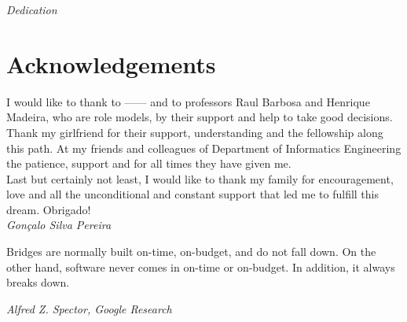 
\pagestyle{empty}
\begin{center}

\emph{Dedication}

\end{center}



\newpage
\pagestyle{fancy}
\section*{Acknowledgements}

I would like to thank to ------ and to professors Raul Barbosa and Henrique Madeira, who are role models, by their support and help to take good decisions.\\

Thank my girlfriend for their support, understanding and the fellowship along this path. At my friends and colleagues of Department of Informatics Engineering the patience, support and for all times they have given me. \\

Last but certainly not least, I would like to thank my family for encouragement, love and all the unconditional and constant support that led me to fulfill this dream. Obrigado!\\



\emph{\hfill Gonçalo Silva Pereira}

\newpage

\vspace*{\fill}
\pagestyle{empty}

\begin{shadequote}
Bridges are normally built on-time, on-budget, and do not
fall down. On the other hand, software never comes in on-time
or on-budget. In addition, it always breaks down.\par\emph{Alfred Z. Spector, Google Research}
\end{shadequote}

